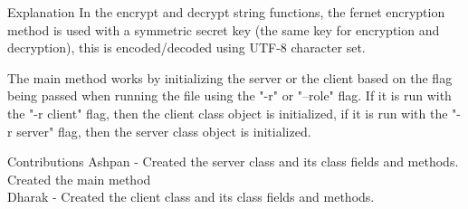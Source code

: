 \documentclass[titlepage]{article}
\begin{document}
\begin{section}{Explanation}
        In the encrypt and decrypt string functions, the fernet encryption method is used with a symmetric secret key (the same key for encryption and decryption), this is encoded/decoded using UTF-8 character set.

        The main method works by initializing the server or the client based on the flag being passed when running the file using the "-r" or "--role" flag. If it is run with the "-r client" flag, then the client class object is initialized, if it is run with the "-r server" flag, then the server class object is initialized.
    \end{section}
    \begin{section}{Contributions}
        Ashpan - Created the server class and its class fields and methods. Created the main method\\
        Dharak - Created the client class and its class fields and methods.
    \end{section}
\end{document}
